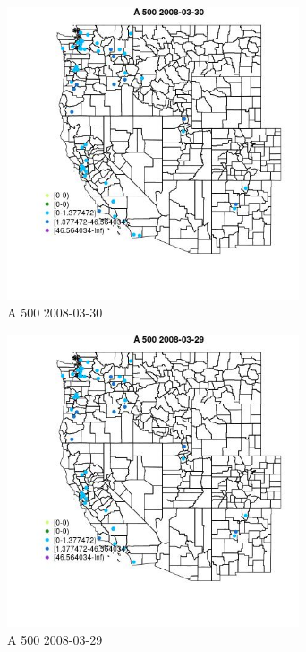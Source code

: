 \begin{figure} 
\centering  
\includegraphics[width=0.77\textwidth]{Code_Outputs/Report_ML_input_PM25_Step4_part_e_de_duplicated_aves_MapObsA_5002008-03-30.jpg} 
\caption{\label{fig:Report_ML_input_PM25_Step4_part_e_de_duplicated_avesMapObsA_5002008-03-30}A 500 2008-03-30} 
\end{figure} 
 

\begin{figure} 
\centering  
\includegraphics[width=0.77\textwidth]{Code_Outputs/Report_ML_input_PM25_Step4_part_e_de_duplicated_aves_MapObsA_5002008-03-29.jpg} 
\caption{\label{fig:Report_ML_input_PM25_Step4_part_e_de_duplicated_avesMapObsA_5002008-03-29}A 500 2008-03-29} 
\end{figure} 
 

